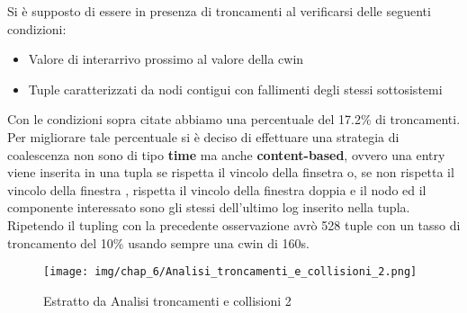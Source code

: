 Si è supposto di essere in presenza di troncamenti al verificarsi delle seguenti condizioni:
\begin{itemize}
\item Valore di interarrivo prossimo al valore della cwin 
\item Tuple caratterizzati da nodi contigui con fallimenti degli stessi sottosistemi
\end{itemize}
Con le condizioni sopra citate abbiamo una percentuale del 17.2\% di troncamenti.\\
Per migliorare tale percentuale si è deciso di effettuare una strategia di coalescenza non sono di tipo \textbf{time} ma anche \textbf{content-based}, ovvero una entry viene inserita in una tupla se rispetta il vincolo della finsetra o, se non rispetta il vincolo della finestra , rispetta il vincolo della finestra doppia e il nodo ed il componente interessato sono gli stessi dell'ultimo log inserito nella tupla.\\
Ripetendo il tupling con la precedente osservazione avrò 528 tuple con un tasso di troncamento del 10\% usando sempre una cwin di 160s.\\
 \begin{figure}[H]
    \centering
    \texttt{[image: img/chap\_6/Analisi\_troncamenti\_e\_collisioni\_2.png]}
    \caption{Estratto da Analisi troncamenti e collisioni 2}
    \label{fig:AnalTroncCollision2}
\end{figure}
\noindent
